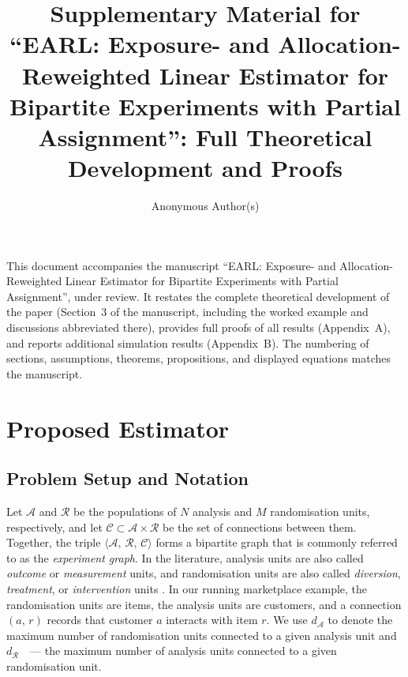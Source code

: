 \documentclass[sigconf,nonacm]{acmart}
\newcounter{assumption}
\begin{document}
\title[Supplementary Material: EARL]{Supplementary Material for ``EARL: Exposure- and Allocation-Reweighted Linear Estimator for Bipartite Experiments with Partial Assignment'': Full Theoretical Development and Proofs}

\author{Anonymous Author(s)}
\affiliation{%
  \institution{}
  \city{}
  \country{}
}
\email{}

\maketitle

\noindent This document accompanies the manuscript ``EARL: Exposure- and Allocation-Reweighted Linear Estimator for Bipartite Experiments with Partial Assignment'', under review. It restates the complete theoretical development of the paper (Section~3 of the manuscript, including the worked example and discussions abbreviated there), provides full proofs of all results (Appendix~A), and reports additional simulation results (Appendix~B). The numbering of sections, assumptions, theorems, propositions, and displayed equations matches the manuscript.

\setcounter{section}{2}

\section{Proposed Estimator}\label{sec:estimator}

\subsection{Problem Setup and Notation}\label{subsec:notation}

Let $\mathcal A$ and $\mathcal R$ be the populations of $N$ analysis and $M$ randomisation units, respectively, and let $\mathcal C\subset \mathcal A \times \mathcal R$ be the set of connections between them. Together, the triple $\langle \mathcal A,\,\mathcal R,\,\mathcal C\rangle$ forms a bipartite graph that is commonly referred to as the \emph{experiment graph}. In the literature, analysis units are also called \emph{outcome} or \emph{measurement} units, and randomisation units are also called \emph{diversion}, \emph{treatment}, or \emph{intervention} units \cite{zigler2021bipartite,harshaw2023erl,doudchenko2020causal,tan2025estimating}. In our running marketplace example, the randomisation units are items, the analysis units are customers, and a connection $(a,\,r)$ records that customer $a$ interacts with item $r$. We use $d_\mathcal{A}$ to denote the maximum number of randomisation units connected to a given analysis unit and $d_\mathcal{R}$~~---  the maximum number of analysis units connected to a given randomisation unit.
\end{document}
